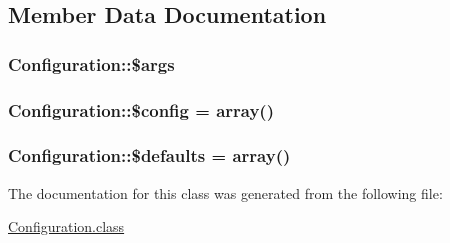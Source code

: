 \subsection{Member Data Documentation}
\hypertarget{classConfiguration_aaa2b9b616ee331722615be0686b32eb0}{
\subsubsection[{\$args}]{\setlength{\rightskip}{0pt plus 5cm}Configuration\-::\$args\hspace{0.3cm}{\ttfamily [private]}}}\label{classConfiguration_aaa2b9b616ee331722615be0686b32eb0}
\hypertarget{classConfiguration_af5a6e50d6af6153b578bf3de3f10d6a1}{
\subsubsection[{\$config}]{\setlength{\rightskip}{0pt plus 5cm}Configuration\-::\$config = array()\hspace{0.3cm}{\ttfamily [private]}}}\label{classConfiguration_af5a6e50d6af6153b578bf3de3f10d6a1}
\hypertarget{classConfiguration_affc661a88f8c9f0169328ea753f4d97b}{
\subsubsection[{\$defaults}]{\setlength{\rightskip}{0pt plus 5cm}Configuration\-::\$defaults = array()\hspace{0.3cm}{\ttfamily [private]}}}\label{classConfiguration_affc661a88f8c9f0169328ea753f4d97b}


The documentation for this class was generated from the following file\-:\begin{DoxyCompactItemize}
\item 
\hyperlink{Configuration_8class}{Configuration.\-class}\end{DoxyCompactItemize}
